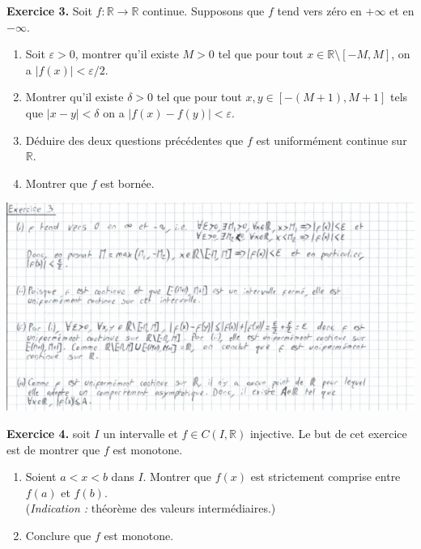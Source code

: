 \documentclass[a4paper, 10pt]{report}
\providecommand{\abs}[1]{\lvert#1\rvert}
\begin{document}
	\newpage
	
	\fancyhf{}
	\renewcommand{\headrule}
	{\rule{\textwidth}{0pt}}
	
	\noindent
	\textbf{Exercice 3.} Soit $f: \mathbb{R} \to \mathbb{R}$ continue.
	Supposons que $f$ tend vers zéro en $+\infty$ et en $-\infty$.
	\begin{enumerate}[label=(\roman*)]
		\item Soit $\varepsilon > 0$, montrer qu'il existe $M > 0$ tel
		que pour tout $x \in \mathbb{R} \setminus [-M, M]$, on a
		$\abs{f(x)} < \varepsilon/2$. 
		\item Montrer qu'il existe $\delta > 0$ tel que pour tout
		$x, y \in [-(M+1), M+1]$ tels que $\abs{x - y} < \delta$ on a
		$\abs{f(x) - f(y)} < \varepsilon$.
		\item Déduire des deux questions précédentes que $f$ est
		uniformément continue sur $\mathbb{R}$.
		\item Montrer que $f$ est bornée.
	\end{enumerate}
	
	\includegraphics{ex03.jpg}
		
	\vspace{5mm}
	\noindent
	\textbf{Exercice 4.} soit $I$ un intervalle et $f \in C(I, \mathbb{R})$
	injective. Le but de cet exercice est de montrer que $f$ est monotone.
	\begin{enumerate}[label=(\roman*)]
		\item Soient $a < x < b$ dans $I$. Montrer que $f(x)$ est
		strictement comprise entre $f(a)$ et $f(b)$.\\
		(\textit{Indication :} théorème des valeurs intermédiaires.)
		\item Conclure que $f$ est monotone.
	\end{enumerate}
	
\end{document}
